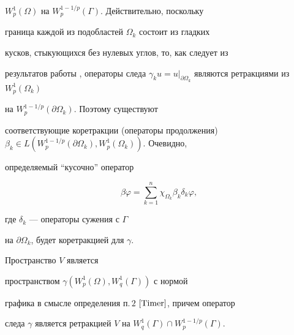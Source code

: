 $W_p^1(\Omega)$ на $W_p^{1-1/p}(\Gamma)$. Действительно, поскольку


граница каждой из подобластей $\Omega_k$ состоит из гладких


кусков, стыкующихся без нулевых углов, то, как следует из


результатов работы \cite{Jak}, операторы следа $\gamma_k u = {u


}|_{\partial \Omega_k}$ являются ретракциями из $W_p^1(\Omega_k)$


на $W_p^{1-1/p}(\partial \Omega_k)$. Поэтому существуют


соответствующие коретракции (операторы продолжения) $\beta_k \in


L(W_p^{1-1/p}(\partial \Omega_k), W_p^1(\Omega_k))$. Очевидно,


определяемый ``кусочно'' оператор


$$


\beta \varphi = \sum_{k=1}^{n} \chi_{\Omega_k} \beta_k \delta_k \varphi,


$$


где $\delta_k$ --- операторы сужения с $\Gamma$ 


на $\partial \Omega_k$, будет коретракцией для $\gamma$.








\begin{thms} \label{retr}


Пространство $V$ является


пространством $\gamma (W_p^1(\Omega), W_q^1(\Gamma))$ с нормой


графика в смысле определения п.\,$2$ $\cite{Timer}$, причем оператор


следа $\gamma$ является ретракцией $V$ на $W_q^1(\Gamma)\cap


W_p^{1-1/p}(\Gamma)$.


\end{thms}





